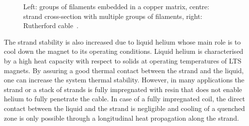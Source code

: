 \begin{figure}[H]
    \centering
    \caption{Left: groups of filaments embedded in a copper matrix, centre: strand cross-section with multiple groups of filaments, right: Rutherford cable~\cite{lhc_machine_outreach}.}
    \label{fig:strand_and_filaments}
\end{figure}

The strand stability is also increased due to liquid helium whose main role is to cool down the magnet to its operating conditions. Liquid helium is characterised by a high heat capacity with respect to solids at operating temperatures of LTS magnets. By assuring a good thermal contact between the strand and the liquid, one can increase the system thermal stability. However, in many applications the strand or a stack of strands is fully impregnated with resin that does not enable helium to fully penetrate the cable. In case of a fully impregnated coil, the direct contact between the liquid and the strand is negligible and cooling of a quenched zone is only possible through a longitudinal heat propagation along the strand.~\cite[p.~122]{superconducting_accelerator_magnets}

